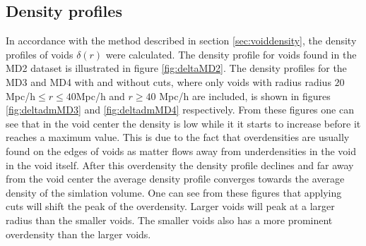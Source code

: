 \subsection{Density profiles}
In accordance with the method described in section \ref{sec:voiddensity}, the density profiles of voids $\delta(r)$ were calculated. The density profile for voids found in the MD2 dataset is illustrated in figure \ref{fig:deltaMD2}. The density profiles for the MD3 and MD4 with and without cuts, where only voids with radius radius $20$Mpc/h$\leq r\leq 40$Mpc/h and $r\geq 40$ Mpc/h are included, is shown in figures \ref{fig:deltadmMD3} and \ref{fig:deltadmMD4} respectively. From these figures one can see that in the void center the density is low while it it starts to increase before it reaches a maximum value. This is due to the fact that overdensities are usually found on the edges of voids as matter flows away from underdensities in the void in the void itself. After this overdensity the density profile declines and far away from the void center the average density profile converges towards the average density of the simlation volume. One can see from these figures that applying cuts will shift the peak of the overdensity. Larger voids will peak at a larger radius than the smaller voids. The smaller voids also has a more prominent overdensity than the larger voids.\\\indent
 
